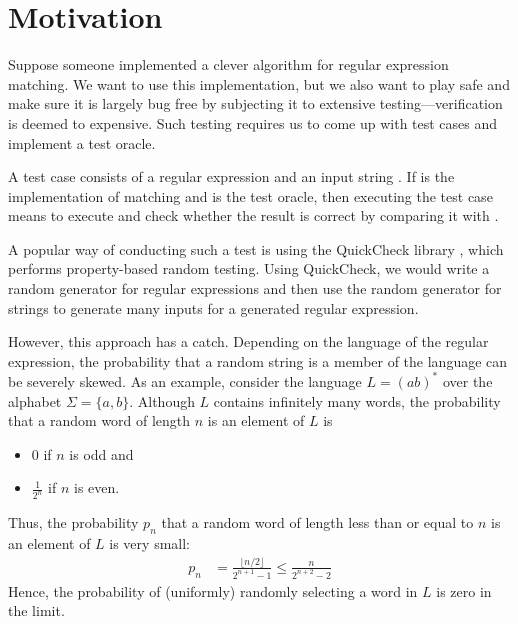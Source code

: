 \section{Motivation}
\label{sec:motivation}

Suppose someone implemented a clever algorithm for
regular expression matching. 
We want to use this implementation, but we also want to play safe and
make sure it is largely bug free by subjecting it to extensive
testing---verification is deemed to expensive.
Such testing requires us to come up with test cases and
implement a test oracle.


A test case consists of a regular expression  and an input
string . If  is the implementation of matching
and  is the test oracle, then
executing the test case means to execute  and check whether the result is correct by comparing it with
. 

A popular way of conducting such a test is using the QuickCheck library
\cite{quickcheck}, which performs property-based random testing. Using
QuickCheck, we would write a random generator for regular expressions
and then use the random generator for strings to generate many inputs for a
generated regular expression.

However, this approach has a
catch. Depending on the language of the regular expression, the
probability that a random string is a member of the language can be
severely skewed. As an example, consider the language $L = (ab)^*$ over the
alphabet $\Sigma = \{a, b\}$. Although $L$ contains infinitely many
words, the probability that a random word of
length $n$ is an element of $L$ is
\begin{itemize}
\item $0$ if $n$ is odd and
\item $\frac{1}{2^n}$ if $n$ is even.
\end{itemize}
Thus, the probability $p_n$ that a random word of length less than or equal to
$n$ is an element of $L$ is very small:
\begin{align*}
  p_n &= \frac{\lfloor n/2 \rfloor}{2^{n+1} - 1}
        \le \frac{n}{2^{n+2} - 2}
\end{align*}
Hence, the probability of (uniformly) randomly
selecting a word in $L$ is zero in the limit.

